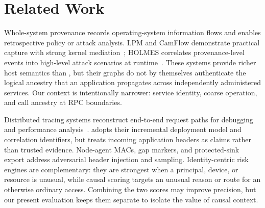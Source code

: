 \section{Related Work}
\label{sec:related}

Whole-system provenance records operating-system information flows and enables
retrospective policy or attack analysis. LPM and CamFlow demonstrate practical
capture with strong kernel mediation~\citep{bates2015trustworthy,pasquier2017practical};
HOLMES correlates provenance-level events into high-level attack scenarios at
runtime~\citep{milajerdi2019holmes}. These systems provide richer host semantics
than \system, but their graphs do not by themselves authenticate the logical
ancestry that an application propagates across independently administered
services. Our context is intentionally narrower: service identity, coarse
operation, and call ancestry at RPC boundaries.

Distributed tracing systems reconstruct end-to-end request paths for debugging
and performance analysis~\citep{sigelman2010dapper}. \system{} adopts their
incremental deployment model and correlation identifiers, but treats incoming
application headers as claims rather than trusted evidence. Node-agent MACs,
gap markers, and protected-sink export address adversarial header injection and
sampling. Identity-centric risk engines are complementary: they are strongest
when a principal, device, or resource is unusual, while causal scoring targets
an unusual reason or route for an otherwise ordinary access. Combining the two
scores may improve precision, but our present evaluation keeps them separate to
isolate the value of causal context.

